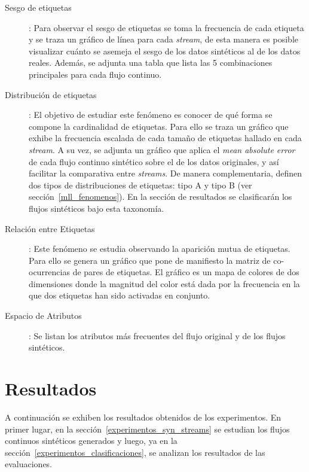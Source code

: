 \begin{description}

	\item[Sesgo de etiquetas]: Para observar el sesgo de etiquetas se toma la
	      frecuencia de cada etiqueta y se traza un gráfico de línea para cada
	      \textit{stream}, de esta manera es posible visualizar cuánto se asemeja
	      el sesgo de los datos sintéticos al de los datos reales. Además, se
	      adjunta una tabla que lista las 5 combinaciones principales para cada
	      flujo continuo.

	\item[Distribución de etiquetas]: El objetivo de estudiar este fenómeno es
	      conocer de qué forma se compone la cardinalidad de etiquetas. Para ello
	      se traza un gráfico que exhibe la frecuencia escalada de cada tamaño de
	      etiquetas hallado en cada \textit{stream}. A su vez, se adjunta un
	      gráfico que aplica el \textit{mean absolute error} de cada flujo
	      continuo sintético sobre el de los datos originales, y así facilitar la
	      comparativa entre \textit{streams}. De manera complementaria,
	      \citeauthor{read_generating_2009} definen dos tipos de distribuciones de
	      etiquetas: tipo A y tipo B (ver sección~\ref{mll_fenomenos}). En la
	      sección de resultados se clasificarán los flujos sintéticos bajo esta
	      taxonomía.

	\item[Relación entre Etiquetas]: Este fenómeno se estudia observando la
	      aparición mutua de etiquetas. Para ello se genera un gráfico que pone de
	      manifiesto la matriz de co-ocurrencias de pares de etiquetas. El gráfico
	      es un mapa de colores de dos dimensiones donde la magnitud del color
	      está dada por la frecuencia en la que dos etiquetas han sido activadas
	      en conjunto.

	\item[Espacio de Atributos]: Se listan los atributos más frecuentes del
	      flujo original y de los flujos sintéticos.

\end{description}


\section{Resultados}

A continuación se exhiben los resultados obtenidos de los experimentos. En
primer lugar, en la sección~\ref{experimentos_syn_streams} se estudian los
flujos continuos sintéticos generados y luego, ya en la
sección~\ref{experimentos_clasificaciones}, se analizan los resultados de las
evaluaciones.

